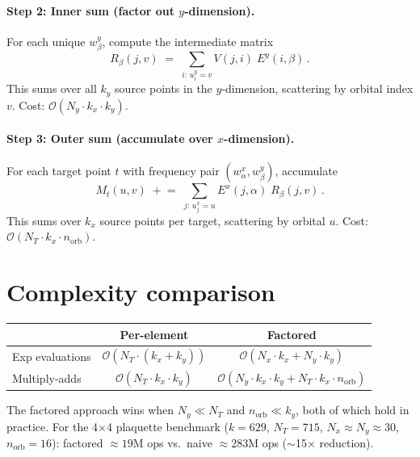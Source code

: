 \documentclass[11pt]{article}
\newcommand{\orb}{n_{\mathrm{orb}}}
\begin{document}
\paragraph{Step 2: Inner sum (factor out $y$-dimension).}
For each unique $w^y_\beta$, compute the intermediate matrix
\begin{equation}\label{eq:R}
  R_\beta(j, v) \;=\; \sum_{i:\, u_i^y = v} V(j, i)\; E^y(i, \beta)\,.
\end{equation}
This sums over all $k_y$ source points in the $y$-dimension,
scattering by orbital index $v$.
Cost: $\mathcal{O}(N_y \cdot k_x \cdot k_y)$.

\paragraph{Step 3: Outer sum (accumulate over $x$-dimension).}
For each target point $t$ with frequency pair $(w^x_\alpha, w^y_\beta)$,
accumulate
\begin{equation}\label{eq:M_factored}
  M_t(u, v) \;\mathrel{+}=\; \sum_{j:\, u_j^x = u} E^x(j, \alpha)\; R_\beta(j, v)\,.
\end{equation}
This sums over $k_x$ source points per target, scattering by orbital $u$.
Cost: $\mathcal{O}(N_T \cdot k_x \cdot \orb)$.


\section{Complexity comparison}

\begin{center}
\begin{tabular}{lcc}
  \hline
  & Per-element & Factored \\
  \hline
  Exp evaluations & $\mathcal{O}(N_T \cdot (k_x + k_y))$ & $\mathcal{O}(N_x \cdot k_x + N_y \cdot k_y)$ \\
  Multiply-adds   & $\mathcal{O}(N_T \cdot k_x \cdot k_y)$ & $\mathcal{O}(N_y \cdot k_x \cdot k_y + N_T \cdot k_x \cdot \orb)$ \\
  \hline
\end{tabular}
\end{center}

The factored approach wins when $N_y \ll N_T$ and $\orb \ll k_y$, both of which hold
in practice.
For the 4$\times$4 plaquette benchmark ($k = 629$, $N_T = 715$,
$N_x \approx N_y \approx 30$, $\orb = 16$):
factored $\approx 19\text{M}$ ops vs.\ naive $\approx 283\text{M}$ ops ($\sim$15$\times$ reduction).
\end{document}
